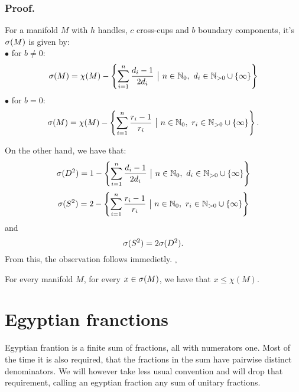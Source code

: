 \subsubsection{Proof.}
For a manifold $M$ with $h$ handles, $c$ cross-cups and $b$ boundary components, it's 
${{\sigma}(M)}$ is given by:\\
$\bullet$ for $b\neq 0$: 
\begin{equation}
\spe(M) = \chi(M) - \left\{\sum\limits_{i=1}^n\frac{d_i-1}{2d_i}\ 
\big|\ n\in\mathbb{N}_0,\ d_i\in\mathbb{N}_{>0}\cup \{\infty\}\right\}
\end{equation}
$\bullet$ for $b = 0$:
\begin{equation}
\spe(M) = \chi(M) - \left\{\sum\limits_{i=1}^n \frac{r_i-1}{r_i}\ \big|\ n\in\mathbb{N}_0,\ 
r_i\in\mathbb{N}_{>0}\cup \{\infty\}\right\}.
\end{equation} 

On the other hand, we have that:
\begin{equation}
\speD = 1-\left\{\sum\limits_{i=1}^n\frac{d_i-1}{2d_i}\ 
\big|\ n\in\mathbb{N}_0,\ d_i\in\mathbb{N}_{>0}\cup \{\infty\}\right\}
\end{equation}
\begin{equation}
\speS = 2 - \left\{\sum\limits_{i=1}^n \frac{r_i-1}{r_i}\ \big|\ n\in\mathbb{N}_0,\ 
r_i\in\mathbb{N}_{>0}\cup \{\infty\}\right\}
\end{equation}
and
\begin{equation}
{{\sigma}(S^2)} = 2{{\sigma}(D^2)}.
\end{equation}
From this, the observation follows immedietly. $_\square$

\begin{observation}
For every manifold $M$, for every $x \in {{\sigma}(M)}$, we have that $x \leq \chi(M)$.
\end{observation}


\section{Egyptian franctions}
Egyptian frantion is a finite sum of fractions, all with numerators one. 
Most of the time it is also required, that the fractions in the sum have pairwise distinct 
denominators. We will however take less usual convention and will drop that requirement, 
calling an egyptian fraction any sum of unitary fractions. 
